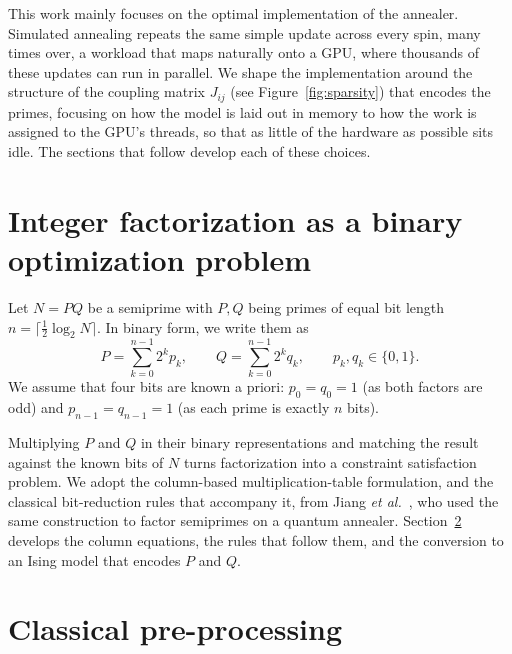 \documentclass[reprint,twocolumn,amsmath,amssymb,nofootinbib]{revtex4-2}
\begin{document}
This work mainly focuses on the optimal implementation of the annealer. Simulated annealing repeats the same simple update across every spin, many times over, a workload that maps naturally onto a GPU, where thousands of these updates can run in parallel. We shape the implementation around the structure of the coupling matrix $J_{ij}$ (see Figure~\ref{fig:sparsity}) that encodes the primes, focusing on how the model is laid out in memory to how the work is assigned to the GPU's threads, so that as little of the hardware as possible sits idle. The sections that follow develop each of these choices.

\section{Integer factorization as a binary optimization problem}\label{sec:formulation}

Let $N = PQ$ be a semiprime with $P, Q$ being primes of equal bit length $n = \lceil \tfrac{1}{2}\log_2 N \rceil$. In binary form, we write them as
\begin{equation}
  P = \sum_{k=0}^{n-1} 2^k p_k,
  \qquad
  Q = \sum_{k=0}^{n-1} 2^k q_k,
  \qquad p_k,q_k \in \{0,1\}.
\end{equation}
We assume that four bits are known a priori: $p_0 = q_0 = 1$ (as both factors are odd) and $p_{n-1} = q_{n-1} = 1$ (as each prime is exactly $n$ bits).

Multiplying $P$ and $Q$ in their binary representations and matching the result against the known bits of $N$ turns factorization into a constraint satisfaction problem. We adopt the column-based multiplication-table formulation, and the classical bit-reduction rules that accompany it, from Jiang \emph{et al.}~\cite{Jiang2018}, who used the same construction to factor semiprimes on a quantum annealer. Section~\ref{sec:preproc} develops the column equations, the rules that follow them, and the conversion to an Ising model that encodes $P$ and $Q$.

\section{Classical pre-processing}\label{sec:preproc}
\end{document}
